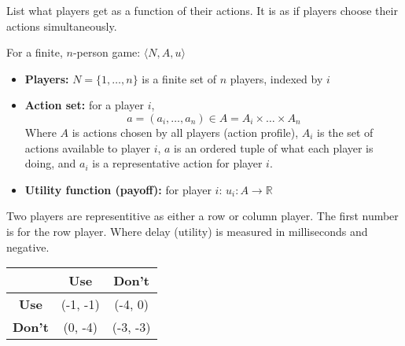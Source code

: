 \documentclass{article}
\begin{document}
\begin{definition}
  List what players get as a function of their actions. 
  It is as if players choose their actions simultaneously.

  For a finite, $n$-person game: $\langle N, A, u \rangle$
  \begin{itemize}
    \item \textbf{Players:} $N = \{1, \ldots, n\}$ is a finite set of $n$ players, indexed by $i$
    \item \textbf{Action set:} for a player $i$,
    $$a = (a_i, \ldots, a_n) \in A = A_i \times \ldots \times A_n$$
    Where $A$ is actions chosen by all players (action profile),
    $A_i$ is the set of actions available to player $i$,
    $a$ is an ordered tuple of what each player is doing,
    and $a_i$ is a representative action for player $i$.
    \item \textbf{Utility function (payoff):} for player $i$: $u_i: A \to \mathbb{R}$
  \end{itemize}
\end{definition}


\begin{example}
  Two players are representitive as either a row or column player.
  The first number is for the row player.
  Where delay (utility) is measured in milliseconds and negative.
  \begin{center}
    \begin{tabular}{|c|c|c|}
      \hline
      & \textbf{Use} & \textbf{Don't} \\
      \hline
      \textbf{Use} & (-1, -1) & (-4, 0) \\  
      \textbf{Don't} & (0, -4) & (-3, -3) \\
      \hline
    \end{tabular}
  \end{center}
\end{example}

\newpage
\end{document}
